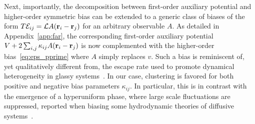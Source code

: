 \documentclass[superscriptaddress, twocolumn, prx, longbibliography, nofootinbib]{revtex4-1}
\begin{document}
Next, importantly, the decomposition between first-order auxiliary potential and higher-order symmetric bias can be extended to a generic class of biases of the form $T{\cal E}_{ij} = {\cal L} A({\bf r}_i-{\bf r}_j)$ for an arbitrary observable $A$. As detailed in Appendix~\ref{app:far}, the corresponding first-order auxiliary potential $V+2\sum_{i,j}\kappa_{ij}A({\bf r}_i-{\bf r}_j)$ is now complemented with the higher-order bias~\eqref{eq:eps_pprime} where $A$ simply replaces $v$. Such a bias is reminiscent of, yet qualitatively different from, the escape rate used to promote dynamical heterogeneity in glassy systems~\cite{Pitard2011, Fullerton2013}. In our case, clustering is favored for both positive and negative bias parameters $\kappa_{ij}$. In particular, this is in contrast with the emergence of a hyperuniform phase, where large scale fluctuations are suppressed, reported when biasing some hydrodynamic theories of diffusive systems~\cite{Jack2015b}.
\end{document}
